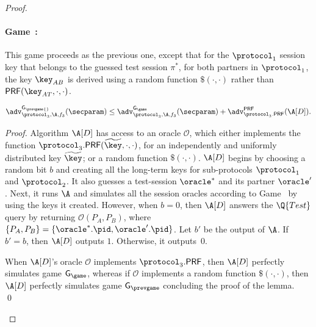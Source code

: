 \begin{proof}
\newgame
\paragraph{Game~\game:}\label{proof:3P-KD:game_hop:PRF->RF}
This game proceeds as the previous one,
except that for the $\protocol_1$ session key that belongs to the 
guessed  test session $\pi^*$, for both partners in $\protocol_1$, the
key $\key_{AB}$ is derived using a random function $\$(\cdot, \cdot)$
rather than $\mathsf{PRF}(\key_{AT}, \cdot, \cdot)$.
\begin{lemma}
$
	\adv_{\protocol_3,\A,f_3}^{\mathsf{G_{\prevgame{}}}}(\secparam) 
	\leq \adv_{\protocol_3,\A,f_3}^{\mathsf{G_\game}}(\secparam) 
	+  \adv_{\protocol_3.\mathsf{PRF}}^{\operatorname{\mathsf{PRF}}}(\A[D])  .
$
\end{lemma}

\begin{proof}
Algorithm $\A[D]$ has access to an oracle $\mathcal{O}$,
which either implements the function $\protocol_3.\mathsf{PRF}(\widetilde{\key}, \cdot, \cdot)$,
for an independently and uniformly distributed key $\widetilde{\key}$;
or a random function $\$(\cdot, \cdot)$.
$\A[D]$ begins by choosing a random bit $b$ and creating all the long-term keys for sub-protocols $\protocol_1$ and $\protocol_2$.
It also guesses a test-session $\oracle^*$ and its partner $\oracle'$.
Next,
it runs $\A$ and simulates all the session oracles according to Game~\prevgame{} by using the keys it created. 
However,
when $b=0$,
then $\A[D]$ answers the $\Q{Test}$ query by returning $\mathcal{O}(P_A,P_B)$,
where $\lbrace P_A, P_B \rbrace = \lbrace \oracle^*.\pid, \oracle'.\pid \rbrace$.
Let $b'$ be the output of $\A$.
If $b' = b$,
then $\A[D]$ outputs $1$.
Otherwise,
it outputs~$0$.

When $\A[D]$'s oracle $\mathcal{O}$ implements $\protocol_3.\mathsf{PRF}$,
then $\A[D]$ perfectly simulates game $\mathsf{G}_{\game}$, whereas if $\mathcal{O}$ 
implements a random function $\$(\cdot,\cdot)$, then $\A[D]$ perfectly simulates game $\mathsf{G}_{\prevgame}$
concluding the proof of the lemma.
\qed
\end{proof}



\end{proof}
